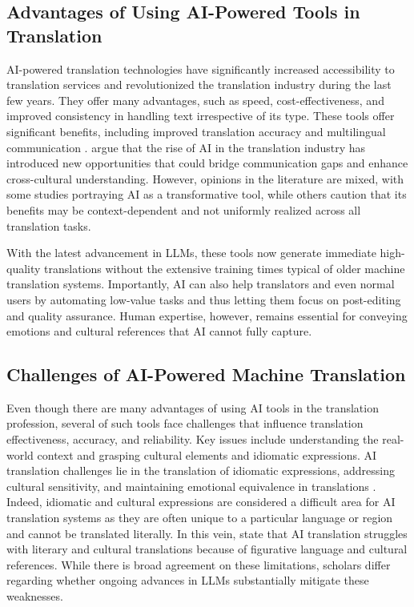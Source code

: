 \documentclass[english]{textolivre}
\begin{document}
\subsection{Advantages of Using AI-Powered Tools in Translation}\label{sec-fmt-manuscrito}
AI-powered translation technologies have significantly increased accessibility to translation services and revolutionized the translation industry during the last few years. They offer many advantages, such as speed, cost-effectiveness, and improved consistency in handling text irrespective of its type. These tools offer significant benefits, including improved translation accuracy and multilingual communication \cite{HuangLiCheung2025LinguisticComplexity,Shahmerdanova2025AITranslation,VieiraOHaganOSullivan2021SocietalImpacts}. \textcite{MohamedEtAl2024AITranslationReview} argue that the rise of AI in the translation industry has introduced new opportunities that could bridge communication gaps and enhance cross-cultural understanding. However, opinions in the literature are mixed, with some studies portraying AI as a transformative tool, while others caution that its benefits may be context-dependent and not uniformly realized across all translation tasks.

With the latest advancement in LLMs, these tools now generate immediate high-quality translations without the extensive training times typical of older machine translation systems. Importantly, AI can also help translators and even normal users by automating low-value tasks and thus letting them focus on post-editing and quality assurance. Human expertise, however, remains essential for conveying emotions and cultural references that AI cannot fully capture.

\subsection{Challenges of AI-Powered Machine Translation}\label{sec-formato}
Even though there are many advantages of using AI tools in the translation profession, several of such tools face challenges that influence translation effectiveness, accuracy, and reliability. Key issues include understanding the real-world context and grasping cultural elements and idiomatic expressions. AI translation challenges lie in the translation of idiomatic expressions, addressing cultural sensitivity, and maintaining emotional equivalence in translations \cite{AlsharifEtAl2026MetaphorChatGPT,BadahEtAl2025LegalTranslationAI,Shahmerdanova2025AITranslation}. Indeed, idiomatic and cultural expressions are considered a difficult area for AI translation systems as they are often unique to a particular language or region and cannot be translated literally. In this vein, \textcite{AlyamiAlzubi2025HumanTranslatorsAI,AlsharifEtAl2026MetaphorChatGPT} state that AI translation struggles with literary and cultural translations because of figurative language and cultural references. While there is broad agreement on these limitations, scholars differ regarding whether ongoing advances in LLMs substantially mitigate these weaknesses.
\end{document}
